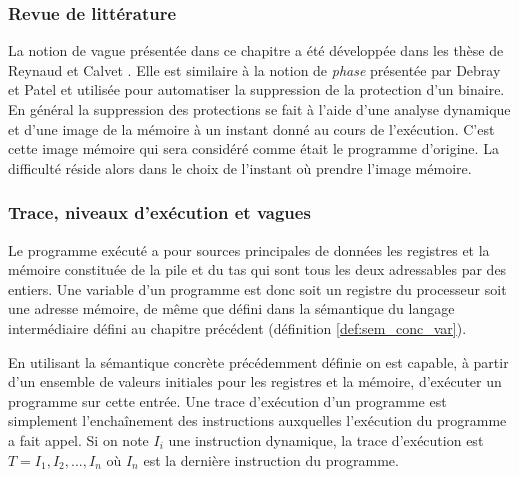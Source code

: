 \subsubsection{Revue de littérature}
La notion de vague présentée dans ce chapitre a été développée dans les thèse de Reynaud \cite{Reynaud2010} et Calvet \cite{Calvet2013}.
Elle est similaire à la notion de \emph{phase} présentée par Debray et Patel \cite{DP10} et utilisée pour automatiser la suppression de la protection d'un binaire.
En général la suppression des protections se fait à l'aide d'une analyse dynamique et d'une image de la mémoire à un instant donné au cours de l'exécution. C'est cette image mémoire qui sera considéré comme était le programme d'origine. La difficulté réside alors dans le choix de l'instant où prendre l'image mémoire.


\subsubsection{Trace, niveaux d'exécution et vagues}
Le programme exécuté a pour sources principales de données les registres et la mémoire constituée de la pile et du tas qui sont tous les deux adressables par des entiers. Une variable d'un programme est donc soit un registre du processeur soit une adresse mémoire, de même que défini dans la sémantique du langage intermédiaire défini au chapitre précédent (définition \ref{def:sem_conc_var}).

En utilisant la sémantique concrète précédemment définie on est capable, à partir d'un ensemble de valeurs initiales pour les registres et la mémoire, d'exécuter un programme sur cette entrée.
Une trace d'exécution d'un programme est simplement l'enchaînement des instructions auxquelles l'exécution du programme a fait appel. Si on note $I_i$ une instruction dynamique, la trace d'exécution est $T=I_1, I_2, ..., I_n$ où $I_n$ est la dernière instruction du programme.

